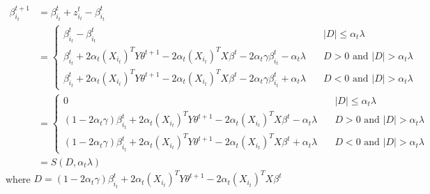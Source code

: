 \documentclass[12pt, reqno]{amsart}
\theoremstyle{definition}
\theoremstyle{remark}
\begin{document}
\begin{equation*}
\begin{split}
\beta_{i_t}^{t+1} &= \beta_{i_t}^t + z_{i_t}^t - \beta_{i_t}^t \\
		&= \left\{
		\begin{array}{ll}
				\beta_{i_t}^t - \beta_{i_t}^t  & \quad |D| \leq 
				\alpha_t \lambda \\
				\beta_{i_t}^t + 2 \alpha_t (X_{i_t})^T Y \theta^{t+1} 
				- 2 \alpha_t (X_{i_t})^T X\beta^t - 2 \alpha_t 
				\gamma\beta_{i_t}^t - \alpha_t \lambda
				 & \quad D > 0 \text{ and } |D| > \alpha_t \lambda \\
				\beta_{i_t}^t + 2 \alpha_t (X_{i_t})^T Y \theta^{t+1} 
				- 2 \alpha_t (X_{i_t})^T X\beta^t - 2 \alpha_t 
				\gamma\beta_{i_t}^t + \alpha_t \lambda
				& \quad D < 0 \text{ and } |D| > \alpha_t \lambda
			\end{array}
			\right. \\
		&= \left\{
		\begin{array}{ll}
				0  & \quad |D| \leq \alpha_t \lambda \\
				(1-2 \alpha_t \gamma)\beta_{i_t}^t + 2 \alpha_t 
				(X_{i_t})^T Y \theta^{t+1} - 2 \alpha_t (X_{i_t})^T 
				X\beta^t - \alpha_t \lambda
				 & \quad D > 0 \text{ and } |D| > \alpha_t \lambda \\
				(1-2 \alpha_t \gamma)\beta_{i_t}^t + 2 \alpha_t 
				(X_{i_t})^T Y \theta^{t+1} - 2 \alpha_t (X_{i_t})^T 
				X\beta^t + \alpha_t \lambda
				& \quad D < 0 \text{ and } |D| > \alpha_t \lambda
			\end{array}
			\right. \\	
		&= S(D, \alpha_t \lambda)		
\end{split}
\end{equation*}
where $D = (1-2 \alpha_t \gamma)\beta_{i_t}^t + 2 \alpha_t (X_{i_t})^T Y \theta^{t+1} - 2 \alpha_t (X_{i_t})^T X\beta^t$
\end{document}
